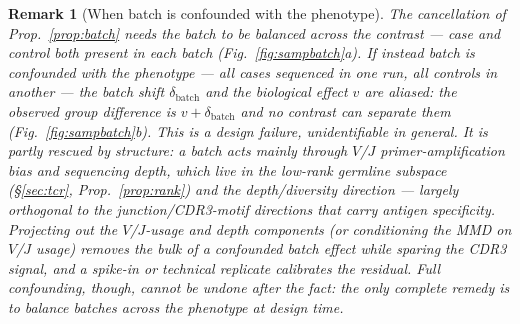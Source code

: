 \documentclass[11pt]{article}
\theoremstyle{oldplain}
\theoremstyle{oldrem}
\newtheorem{remark}{Remark}
\begin{document}
\begin{remark}[When batch is confounded with the phenotype]\label{rem:batchconfound}
The cancellation of Prop.~\ref{prop:batch} needs the batch to be \emph{balanced} across the contrast --- case
and control both present in each batch (Fig.~\ref{fig:sampbatch}a). If instead batch is \emph{confounded} with
the phenotype --- all cases sequenced in one run, all controls in another --- the batch shift
$\delta_{\mathrm{batch}}$ and the biological effect $v$ are aliased: the observed group difference is
$v+\delta_{\mathrm{batch}}$ and no contrast can separate them (Fig.~\ref{fig:sampbatch}b). This is a design
failure, unidentifiable in general. It is \emph{partly} rescued by structure: a batch acts mainly through
$V$/$J$ primer-amplification bias and sequencing depth, which live in the low-rank germline subspace
(\S\ref{sec:tcr}, Prop.~\ref{prop:rank}) and the depth/diversity direction --- largely orthogonal to the
junction/{\scshape CDR3}-motif directions that carry antigen specificity. Projecting out the $V$/$J$-usage and
depth components (or conditioning the {\scshape MMD} on $V$/$J$ usage) removes the bulk of a confounded batch
effect while sparing the {\scshape CDR3} signal, and a spike-in or technical replicate calibrates the residual.
Full confounding, though, cannot be undone after the fact: the only complete remedy is to balance batches
across the phenotype at design time.
\end{remark}
\end{document}
